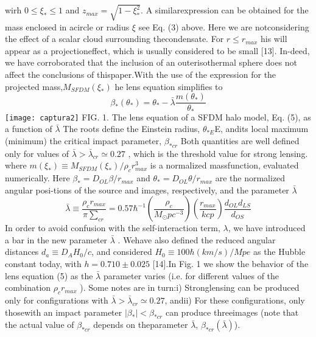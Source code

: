 \documentclass{article}\newcommand\Star[1]{#1\textsuperscript{*}}
\begin{document}
\begin{multicols}{2}
\begin{equation}
\end{equation}
wirh \(0\leq \xi_{*}\leq 1 \) and \(z_{max} = \sqrt{1-\xi^{2}_{*}}\). A  similarexpression  can  be  obtained  for  the  mass  enclosed  in  acircle  or  radius \(\xi\) see  Eq.   (3)  above.   Here  we  are  notconsidering the effect of a scalar cloud surrounding thecondensate.  For \(r \leq r_{max}\) his will appear as a projectioneffect,  which is usually considered to be small [13].  In-deed, we have corroborated that the inclusion of an outerisothermal sphere does not affect the conclusions of thispaper.With the use of the expression for the projected mass,\(M_{SFDM}(\xi_{*})\) he lens equation simplifies to
\begin{equation}\tag{5a}
	\beta_{*}(\theta_{*})=\theta_{*}-\bar{\lambda} \frac{m(\theta_{*})}{\theta_{*}}
\end{equation}
\texttt{[image: captura2]}
FIG. 1.  The lens equation of a SFDM halo model, Eq.  (5), as a function of \(\bar{\lambda}\) The roots define the Einstein radius, \(\theta_{*E}\)E, andits local maximum (minimum) the critical impact parameter, \(\beta_{*cr}\) Both quantities are well defined only for values of \(\bar{\lambda}>\bar{\lambda}_{cr}\simeq0.27\) , which is the threshold value for strong lensing.\\
where \(m(\xi_{*})\equiv M_{SFDM}(\xi_{*})/\rho_{c}r_{max}^{3}\) is a normalized massfunction, evaluated numerically.  Here \(\beta_{*}=D_{OL}\beta/r_{max}\) and \(\theta_{*}=D_{OL}\theta/r_{max}\) are  the  normalized  angular  posi-tions of the source and images, respectively, and the parameter \(\bar{\lambda}\)\\
\begin{equation}\tag{5b}
	\bar{\lambda}\equiv\frac{\rho_{c}r_{max}}{\pi\sum_{cr}}=0.57\hbar^{-1}(\frac{\rho_{c}}{M_{\odot}pc^{-3}})(\frac{r_{max}}{kcp})\frac{d_{OL}d_{LS}}{d_{OS}} 
\end{equation}
In order to avoid confusion with the self-interaction term, \(\lambda\), we have introduced a bar in the new parameter \(\bar{\lambda}\) .  Wehave  also  defined  the  reduced  angular  distances \(d_{a}\equiv D_{A}H_{0}/c\), and considered \(H_{0} \equiv 100 \hbar (km/s)/Mpe\) as the Hubble constant today, with \(h=0.710 \pm 0.025\) [14].In Fig. 1 we show the behavior of the lens equation (5) as the \(\bar{\lambda}\) parameter varies (i.e.  for different values of the combination \(\rho_{c} r_{max}\) ).  Some notes are in turn:i) Stronglensing can be produced only for configurations with \(\bar{\lambda} > \bar{\lambda}_{cr}\simeq 0.27\), andii) For these configurations, only thosewith an impact parameter \(|\beta_{*}|<\beta_{*cr}\) can produce threeimages (note that the actual value of \(\beta_{*cr}\) depends on theparameter \(\bar{\lambda}\), \(\beta_{*cr}(\bar{\lambda})\)). \\

\end{multicols}
\end{document}
